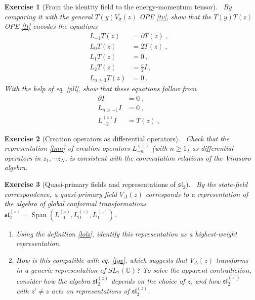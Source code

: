 \documentclass[12pt, a4paper, notitlepage, twoside]{report}
\numberwithin{equation}{section}
\theoremstyle{break}
\newtheorem{exo}{Exercise}[chapter]
\begin{document}
\begin{exo}[From the identity field to the energy-momentum tensor]
 ~\label{exoit}
By comparing it with the general $T(y)V_\sigma(z)$ OPE \eqref{tv}, show that the $T(y)T(z)$ OPE \eqref{tt} encodes the equations
\begin{align}
 L_{-1}T(z) &= \partial T(z) \ ,
\label{lmt}
\\
L_0 T(z) &= 2 T(z)\ ,
\\
L_1 T(z) &= 0 \ ,
\\
L_2 T(z) &= \frac{c}{2} I\ ,
\\
L_{n\geq 3} T(z) &= 0 \ .
\label{lgt}
\end{align}
With the help of eq. \eqref{pll}, show that these equations follow from 
\begin{align}
 \partial I & = 0\ ,
\label{piz}
\\
 L_{n\geq -1} I& = 0\ ,
\\
L_{-2}^{(z)}I & = T(z)\ ,
\label{let}
\end{align}
\end{exo}


\begin{exo}[Creation operators as differential operators]
 ~\label{exodma}
 Check that the representation \eqref{lmn} of creation operators $L_{-n}^{(z_i)}$ (with $n\geq 1$) as differential operators in $z_1,\cdots z_N$, is consistent with the commutation relations of the Virasoro algebra. 
\end{exo}

\begin{exo}[Quasi-primary fields and representations of $\mathfrak{sl}_2$]
 ~\label{exoqp}
By the state-field correspondence, a quasi-primary field $V_\Delta(z)$ corresponds to a representation of the algebra of global conformal transformations $\mathfrak{sl}_2^{(z)} = \operatorname{Span}(L_{-1}^{(z)},L_0^{(z)},L_1^{(z)})$.
\begin{enumerate}
 \item 
Using the definition \eqref{lolz}, identify this representation as a highest-weight representation.
\item
How is this compatible with eq. \eqref{tgv}, which suggests that $V_\Delta(z)$ transforms in a generic representation of $SL_2({\mathbb{C}})$? To solve the apparent contradiction, consider how the algebra $\mathfrak{sl}_2^{(z)}$ depends on the choice of $z$, and how $\mathfrak{sl}_2^{(z')}$ with $z'\neq z$ acts on representations of $\mathfrak{sl}_2^{(z)}$.
\end{enumerate}
\end{exo}
\end{document}
